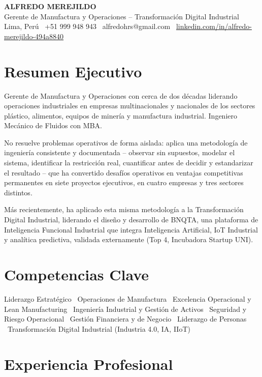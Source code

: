 \documentclass[10pt,a4paper]{article}
\begin{document}
\begin{center}
{\LARGE \textbf{ALFREDO MEREJILDO}}\\[2pt]
Gerente de Manufactura y Operaciones -- Transformaci\'on Digital Industrial\\[2pt]
Lima, Per\'u \textbullet\ +51 999 948 943 \textbullet\ alfredohrs@gmail.com \textbullet\ \href{https://www.linkedin.com/in/alfredo-merejildo-494a8840}{linkedin.com/in/alfredo-merejildo-494a8840}
\end{center}

\section*{Resumen Ejecutivo}
Gerente de Manufactura y Operaciones con cerca de dos d\'ecadas liderando operaciones industriales en empresas multinacionales y nacionales de los sectores pl\'astico, alimentos, equipos de miner\'ia y manufactura industrial. Ingeniero Mec\'anico de Fluidos con MBA.

No resuelve problemas operativos de forma aislada: aplica una metodolog\'ia de ingenier\'ia consistente y documentada -- observar sin supuestos, modelar el sistema, identificar la restricci\'on real, cuantificar antes de decidir y estandarizar el resultado -- que ha convertido desaf\'ios operativos en ventajas competitivas permanentes en siete proyectos ejecutivos, en cuatro empresas y tres sectores distintos.

M\'as recientemente, ha aplicado esta misma metodolog\'ia a la Transformaci\'on Digital Industrial, liderando el dise\~no y desarrollo de BNQTA, una plataforma de Inteligencia Funcional Industrial que integra Inteligencia Artificial, IoT Industrial y anal\'itica predictiva, validada externamente (Top 4, Incubadora Startup UNI).

\section*{Competencias Clave}
Liderazgo Estrat\'egico \textbullet\ Operaciones de Manufactura \textbullet\ Excelencia Operacional y Lean Manufacturing \textbullet\ Ingenier\'ia Industrial y Gesti\'on de Activos \textbullet\ Seguridad y Riesgo Operacional \textbullet\ Gesti\'on Financiera y de Negocio \textbullet\ Liderazgo de Personas \textbullet\ Transformaci\'on Digital Industrial (Industria 4.0, IA, IIoT)

\section*{Experiencia Profesional}
\end{document}
